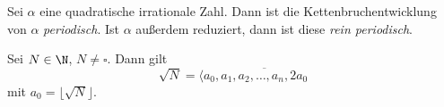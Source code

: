 \begin{thm}[Lagrange]\autolabel
	Sei $\alpha$ eine quadratische irrationale Zahl. Dann ist die Kettenbruchentwicklung von $\alpha$ \emph{periodisch}. Ist $\alpha$ außerdem reduziert, dann ist diese \emph{rein periodisch}.
\end{thm}

\begin{cor}\autolabel
	Sei $N \in \N$, $N \neq \square$. Dann gilt
	\[ \sqrt{N} = \langle a_0, \overbar{a_1,a_2,\dotsc,a_n,2a_0} \]
	mit $a_0 = \lfloor \sqrt{N} \rfloor$.
\end{cor}